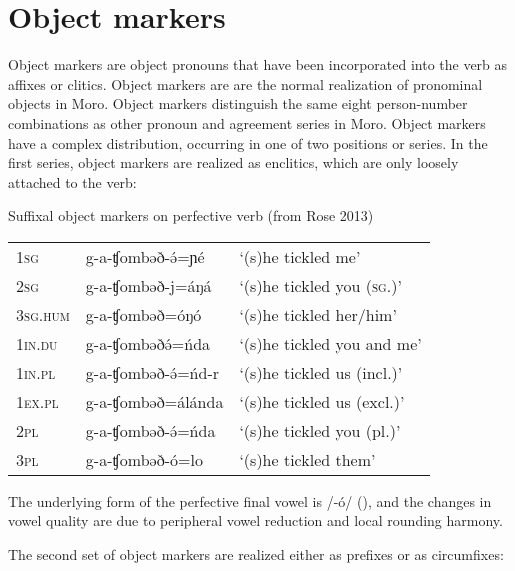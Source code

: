 
\section{Object markers}\label{sec:ch7:om}

Object markers are object pronouns that have been incorporated into the verb as affixes or clitics. Object markers are are the normal realization of pronominal objects in Moro. Object markers distinguish the same eight person-number combinations as other pronoun and agreement series in Moro. Object markers have a complex distribution, occurring in one of two positions or series. In the first series, object markers are realized as enclitics, which are only loosely attached to the verb:

\ea Suffixal object markers on perfective verb (from Rose 2013)\\ %
\begin{tabular}[t]{lll}
1\textsc{sg} & g-a-ʧombəð-ə́=ɲé	& `(s)he tickled me'\\ 
2\textsc{sg} & g-a-ʧombəð-j=áŋá & `(s)he tickled you (\textsc{sg}.)'\\
3\textsc{sg.hum} & g-a-ʧombəð=óŋó & `(s)he tickled her/him'\\
1\textsc{in}.\textsc{du} & g-a-ʧombəðə́=ńda & `(s)he tickled you and me'\\
1\textsc{in}.\textsc{pl} & g-a-ʧombəð-ə́=ńd-r & `(s)he tickled us (incl.)'\\
1\textsc{ex}.\textsc{pl} & g-a-ʧombəð=álánda& `(s)he tickled us (excl.)'\\
2\textsc{pl} &  g-a-ʧombəð-ə́=ńda & `(s)he tickled you (pl.)'\\
3\textsc{pl} &  g-a-ʧombəð-ó=lo & `(s)he tickled them'\\
\end{tabular} \label{ex:ch7:pfvom}
\z

The underlying form of the perfective final vowel is /-ó/ (), and the changes in vowel quality are due to peripheral vowel reduction and local rounding harmony.

The second set of object markers are realized either as prefixes or as circumfixes:

